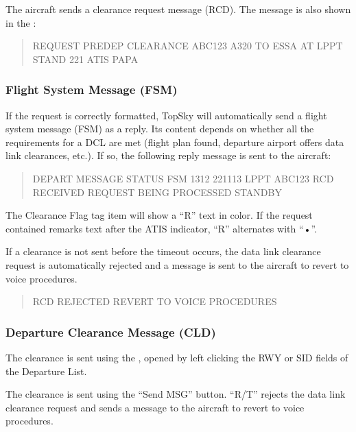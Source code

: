 \documentclass[a4paper,oneside,11pt]{memoir}
\begin{document}
The aircraft sends a clearance request message (RCD). The message is also shown in the :

\begin{quote}
  REQUEST PREDEP CLEARANCE ABC123 A320 TO ESSA AT LPPT STAND 221 ATIS PAPA
\end{quote}

\subsubsection{Flight System Message (FSM)}

If the request is correctly formatted, TopSky will automatically send a flight system message (FSM) as a reply. Its content depends on whether all the requirements for a DCL are met (flight plan found, departure airport offers data link clearances, etc.). If so, the following reply message is sent to the aircraft:

\begin{quote}
  DEPART MESSAGE STATUS FSM 1312 221113 LPPT ABC123 RCD RECEIVED REQUEST BEING PROCESSED STANDBY 
\end{quote}

The Clearance Flag tag item will show a “R” text in  color. If the request contained remarks text after the ATIS indicator, “R” alternates with “•”.

\bigskip

If a clearance is not sent before the timeout occurs, the data link clearance request is automatically rejected and a message is sent to the aircraft to revert to voice procedures.

\begin{quote}
  RCD REJECTED REVERT TO VOICE PROCEDURES
\end{quote}

\subsubsection{Departure Clearance Message (CLD)}

The clearance is sent using the , opened by left clicking the RWY or SID fields of the Departure List. 


The clearance is sent using the “Send MSG” button. “R/T” rejects the data link clearance request and sends a message to the aircraft to revert to voice procedures. 
\end{document}
